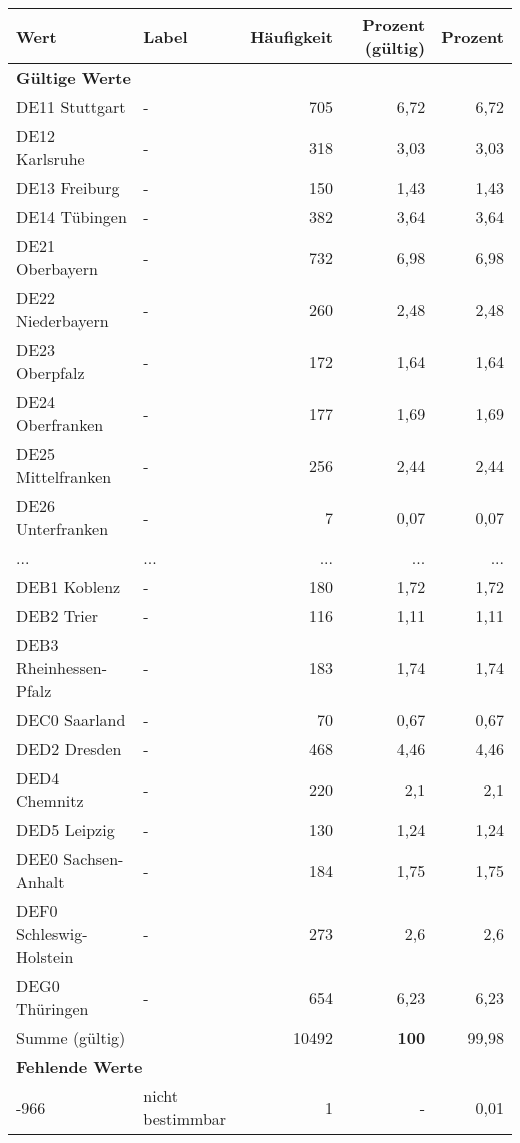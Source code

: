      \begin{longtable}{Xlrrr}
     \toprule
     \textbf{Wert} & \textbf{Label} & \textbf{Häufigkeit} & \textbf{Prozent (gültig)} & \textbf{Prozent} \\
     \endhead
     \midrule
     \multicolumn{5}{l}{\textbf{Gültige Werte}}\\
        \multicolumn{1}{X}{DE11 Stuttgart} & - & 705 & 6,72 & 6,72 \\
        \multicolumn{1}{X}{DE12 Karlsruhe} & - & 318 & 3,03 & 3,03 \\
        \multicolumn{1}{X}{DE13 Freiburg} & - & 150 & 1,43 & 1,43 \\
        \multicolumn{1}{X}{DE14 Tübingen} & - & 382 & 3,64 & 3,64 \\
        \multicolumn{1}{X}{DE21 Oberbayern} & - & 732 & 6,98 & 6,98 \\
        \multicolumn{1}{X}{DE22 Niederbayern} & - & 260 & 2,48 & 2,48 \\
        \multicolumn{1}{X}{DE23 Oberpfalz} & - & 172 & 1,64 & 1,64 \\
        \multicolumn{1}{X}{DE24 Oberfranken} & - & 177 & 1,69 & 1,69 \\
        \multicolumn{1}{X}{DE25 Mittelfranken} & - & 256 & 2,44 & 2,44 \\
        \multicolumn{1}{X}{DE26 Unterfranken} & - & 7 & 0,07 & 0,07 \\
       ... & ... & ... & ... & ... \\
        \multicolumn{1}{X}{DEB1 Koblenz} & - & 180 & 1,72 & 1,72 \\
        \multicolumn{1}{X}{DEB2 Trier} & - & 116 & 1,11 & 1,11 \\
        \multicolumn{1}{X}{DEB3 Rheinhessen-Pfalz} & - & 183 & 1,74 & 1,74 \\
        \multicolumn{1}{X}{DEC0 Saarland} & - & 70 & 0,67 & 0,67 \\
        \multicolumn{1}{X}{DED2 Dresden} & - & 468 & 4,46 & 4,46 \\
        \multicolumn{1}{X}{DED4 Chemnitz} & - & 220 & 2,1 & 2,1 \\
        \multicolumn{1}{X}{DED5 Leipzig} & - & 130 & 1,24 & 1,24 \\
        \multicolumn{1}{X}{DEE0 Sachsen-Anhalt} & - & 184 & 1,75 & 1,75 \\
        \multicolumn{1}{X}{DEF0 Schleswig-Holstein} & - & 273 & 2,6 & 2,6 \\
        \multicolumn{1}{X}{DEG0 Thüringen} & - & 654 & 6,23 & 6,23 \\
     \midrule
      \multicolumn{2}{l}{Summe (gültig)} & 10492 &
      \textbf{100} &
         99,98 \\
     \multicolumn{5}{l}{\textbf{Fehlende Werte}}\\
       -966 & nicht bestimmbar & 1 & - & 0,01 \\


\end{longtable}
